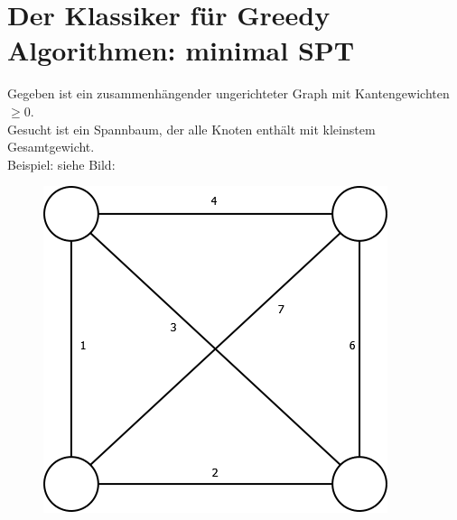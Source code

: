  \section{Der Klassiker für Greedy Algorithmen: minimal SPT}
 Gegeben ist ein zusammenhängender ungerichteter Graph mit Kantengewichten $\geq 0$.\\
 Gesucht ist ein Spannbaum, der alle Knoten enthält mit kleinstem Gesamtgewicht.\\
 Beispiel: siehe Bild:\\
 \begin{figure}[h]
    \begin{center}
        \includegraphics[width=\textwidth / 2]{../GFX/vl13_9.png}
        \label{fig:vl13_1}
    \end{center}
\end{figure}
